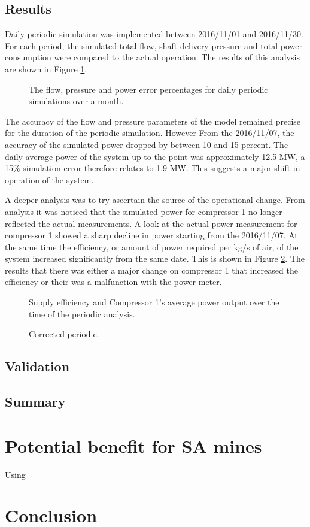 	     \subsection{Results}
	     Daily periodic simulation was implemented between 2016/11/01 and 2016/11/30. For each period, the simulated total flow, shaft delivery pressure and total power consumption were compared to the actual operation. The results of this analysis are shown in Figure \ref{fig: Periodic simulation}.
	     \par 
	     
	\begin{figure}[h]
		\centering
		\fbox{}
		\caption{The flow, pressure and power error percentages for daily periodic simulations over a month.}
		\label{fig: Periodic simulation}
	\end{figure}   
The accuracy of the flow and pressure parameters of the model remained precise for the duration of the periodic simulation. However From the 2016/11/07, the accuracy of the simulated power dropped by between 10 and 15 percent. The daily average power of the system up to the point was approximately 12.5 MW, a 15\% simulation error therefore relates to 1.9 MW. This suggests a major shift in operation of the system.
\par 
A deeper analysis was to try ascertain the source of the operational change. From analysis it was noticed that the simulated power for compressor 1  no longer reflected the actual measurements. A look at the actual power measurement for compressor 1 showed a sharp decline in power starting from the 2016/11/07. At the same time the efficiency, or amount of power required per kg/s of air, of the system increased significantly from the same date. This is shown in Figure \ref{fig: MeasurementAccuracy.}. The results that there was either a major change on compressor 1 that increased the efficiency or their was a malfunction with the power meter.
	\begin{figure}[h]
		\centering
		\fbox{}
		\caption{Supply efficiency and Compressor 1's average power output over the time of the periodic analysis.}
		\label{fig: MeasurementAccuracy.}
	\end{figure}    
	\begin{figure}[h]
		\centering
		\fbox{}
		\caption{Corrected periodic.}
		\label{fig: Corrected Periodic simulation}
	\end{figure}    
	\subsection{Validation}
	\subsection{Summary}
\newpage
\section{Potential benefit for SA mines}

	Using  
\section{Conclusion}